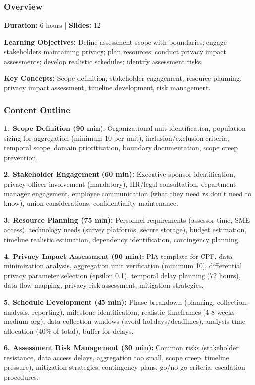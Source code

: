 \documentclass[11pt,a4paper]{article}
\begin{document}
\subsubsection{Overview}
\textbf{Duration:} 6 hours | \textbf{Slides:} 12

\textbf{Learning Objectives:} Define assessment scope with boundaries; engage stakeholders maintaining privacy; plan resources; conduct privacy impact assessments; develop realistic schedules; identify assessment risks.

\textbf{Key Concepts:} Scope definition, stakeholder engagement, resource planning, privacy impact assessment, timeline development, risk management.

\subsubsection{Content Outline}

\textbf{1. Scope Definition (90 min):} Organizational unit identification, population sizing for aggregation (minimum 10 per unit), inclusion/exclusion criteria, temporal scope, domain prioritization, boundary documentation, scope creep prevention.

\textbf{2. Stakeholder Engagement (60 min):} Executive sponsor identification, privacy officer involvement (mandatory), HR/legal consultation, department manager engagement, employee communication (what they need vs don't need to know), union considerations, confidentiality maintenance.

\textbf{3. Resource Planning (75 min):} Personnel requirements (assessor time, SME access), technology needs (survey platforms, secure storage), budget estimation, timeline realistic estimation, dependency identification, contingency planning.

\textbf{4. Privacy Impact Assessment (90 min):} PIA template for CPF, data minimization analysis, aggregation unit verification (minimum 10), differential privacy parameter selection (epsilon 0.1), temporal delay planning (72 hours), data flow mapping, privacy risk assessment, mitigation strategies.

\textbf{5. Schedule Development (45 min):} Phase breakdown (planning, collection, analysis, reporting), milestone identification, realistic timeframes (4-8 weeks medium org), data collection windows (avoid holidays/deadlines), analysis time allocation (40\% of total), buffer for delays.

\textbf{6. Assessment Risk Management (30 min):} Common risks (stakeholder resistance, data access delays, aggregation too small, scope creep, timeline pressure), mitigation strategies, contingency plans, go/no-go criteria, escalation procedures.
\end{document}
